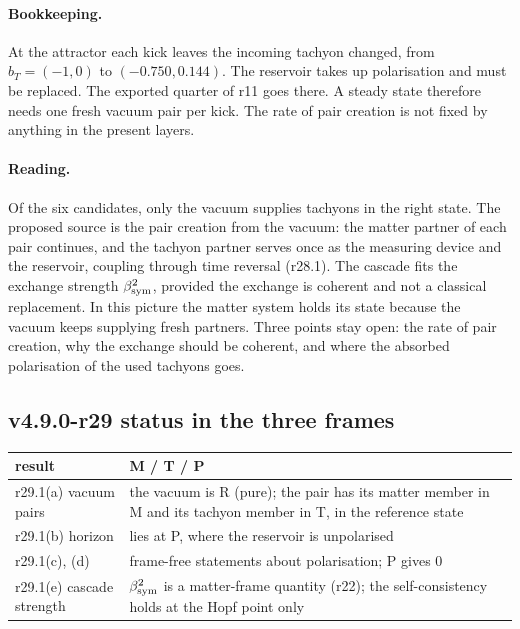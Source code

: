 \paragraph{Bookkeeping.}
At the attractor each kick leaves the incoming tachyon changed, from \(b_T=(-1,0)\) to \((-0.750,0.144)\).  The reservoir takes up
polarisation and must be replaced.  The exported quarter of r11 goes there.  A steady state therefore needs one fresh vacuum pair
per kick.  The rate of pair creation is not fixed by anything in the present layers.

\paragraph{Reading.}
Of the six candidates, only the vacuum supplies tachyons in the right state.  The proposed source is the pair creation from the
vacuum: the matter partner of each pair continues, and the tachyon partner serves once as the measuring device and the reservoir,
coupling through time reversal (r28.1).  The cascade fits the exchange strength \(\beta_{\mathrm{sym}}^2\), provided the exchange is coherent and
not a classical replacement.  In this picture the matter system holds its state because the vacuum keeps supplying fresh
partners.  Three points stay open: the rate of pair creation, why the exchange should be coherent, and where the absorbed
polarisation of the used tachyons goes.

\subsection*{v4.9.0-r29 status in the three frames}
\label{subsec:v490-r29-frames}

\begin{center}
\small
\begin{tabular}{@{}>{\raggedright\arraybackslash}p{}>{\raggedright\arraybackslash}p{}@{}}
\toprule
result & M / T / P\\
\midrule
r29.1(a) vacuum pairs & the vacuum is R (pure); the pair has its matter member in M and its tachyon member in T, in the reference state\\
r29.1(b) horizon & lies at P, where the reservoir is unpolarised\\
r29.1(c), (d) & frame-free statements about polarisation; P gives \(0\)\\
r29.1(e) cascade strength & \(\beta_{\mathrm{sym}}^2\) is a matter-frame quantity (r22); the self-consistency holds at the Hopf point only\\
\bottomrule
\end{tabular}
\end{center}


